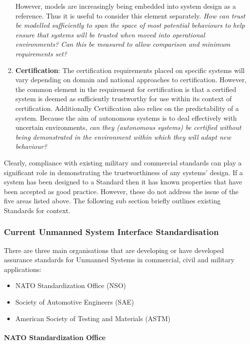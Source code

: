 \begin{enumerate}
     However, models are increasingly being embedded into system design as a reference.
     Thus it is useful to consider this element separately.
 \textit{How can trust be modelled sufficiently to span the space of most potential behaviours to help ensure that systems will be trusted when moved into operational environments?
     Can this be measured to allow comparison and minimum requirements set?}
   \item \textbf{Certification}: The certification requirements placed on specific systems will vary depending on domain and national approaches to certification.
     However, the common element in the requirement for certification is that a certified system is deemed as sufficiently trustworthy for use within its context of certification.
     Additionally Certification also relies on the predictability of a system.
     Because the aim of autonomous systems is to deal effectively with uncertain environments, \textit{can they (autonomous systems) be certified without being demonstrated in the environment within which they will adapt new behaviour?}
 \end{enumerate}

 Clearly, compliance with existing military and commercial standards can play a significant role in demonstrating the trustworthiness of any systems’ design.
 If a system has been designed to a Standard then it has known properties that have been accepted as good practice.
 However, these do not address the issue of the five areas listed above.
 The following sub section briefly outlines existing Standards for context.
 
 \subsubsection{Current Unmanned System Interface Standardisation}
 There are three main organisations that are developing or have developed assurance standards for Unmanned Systems in commercial, civil and military applications:
 \begin{itemize}
   \item NATO Standardization Office (NSO)
   \item Society of Automotive Engineers (SAE)
   \item American Society of Testing and Materials (ASTM)
 \end{itemize}
 
 \paragraph{NATO Standardization Office}
 
